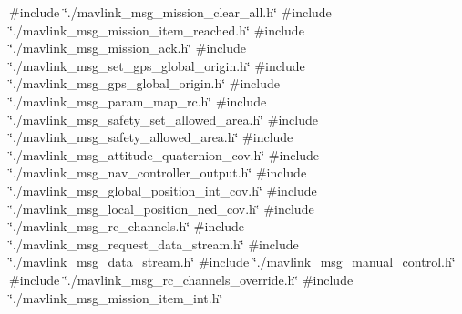 {\ttfamily \#include \char`\"{}./mavlink\+\_\+msg\+\_\+mission\+\_\+clear\+\_\+all.\+h\char`\"{}}\newline
{\ttfamily \#include \char`\"{}./mavlink\+\_\+msg\+\_\+mission\+\_\+item\+\_\+reached.\+h\char`\"{}}\newline
{\ttfamily \#include \char`\"{}./mavlink\+\_\+msg\+\_\+mission\+\_\+ack.\+h\char`\"{}}\newline
{\ttfamily \#include \char`\"{}./mavlink\+\_\+msg\+\_\+set\+\_\+gps\+\_\+global\+\_\+origin.\+h\char`\"{}}\newline
{\ttfamily \#include \char`\"{}./mavlink\+\_\+msg\+\_\+gps\+\_\+global\+\_\+origin.\+h\char`\"{}}\newline
{\ttfamily \#include \char`\"{}./mavlink\+\_\+msg\+\_\+param\+\_\+map\+\_\+rc.\+h\char`\"{}}\newline
{\ttfamily \#include \char`\"{}./mavlink\+\_\+msg\+\_\+safety\+\_\+set\+\_\+allowed\+\_\+area.\+h\char`\"{}}\newline
{\ttfamily \#include \char`\"{}./mavlink\+\_\+msg\+\_\+safety\+\_\+allowed\+\_\+area.\+h\char`\"{}}\newline
{\ttfamily \#include \char`\"{}./mavlink\+\_\+msg\+\_\+attitude\+\_\+quaternion\+\_\+cov.\+h\char`\"{}}\newline
{\ttfamily \#include \char`\"{}./mavlink\+\_\+msg\+\_\+nav\+\_\+controller\+\_\+output.\+h\char`\"{}}\newline
{\ttfamily \#include \char`\"{}./mavlink\+\_\+msg\+\_\+global\+\_\+position\+\_\+int\+\_\+cov.\+h\char`\"{}}\newline
{\ttfamily \#include \char`\"{}./mavlink\+\_\+msg\+\_\+local\+\_\+position\+\_\+ned\+\_\+cov.\+h\char`\"{}}\newline
{\ttfamily \#include \char`\"{}./mavlink\+\_\+msg\+\_\+rc\+\_\+channels.\+h\char`\"{}}\newline
{\ttfamily \#include \char`\"{}./mavlink\+\_\+msg\+\_\+request\+\_\+data\+\_\+stream.\+h\char`\"{}}\newline
{\ttfamily \#include \char`\"{}./mavlink\+\_\+msg\+\_\+data\+\_\+stream.\+h\char`\"{}}\newline
{\ttfamily \#include \char`\"{}./mavlink\+\_\+msg\+\_\+manual\+\_\+control.\+h\char`\"{}}\newline
{\ttfamily \#include \char`\"{}./mavlink\+\_\+msg\+\_\+rc\+\_\+channels\+\_\+override.\+h\char`\"{}}\newline
{\ttfamily \#include \char`\"{}./mavlink\+\_\+msg\+\_\+mission\+\_\+item\+\_\+int.\+h\char`\"{}}\newline
